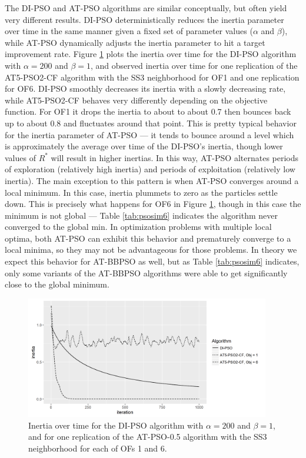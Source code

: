 \documentclass[cmbright]{staauth}
\begin{document}
The DI-PSO and AT-PSO algorithms are similar conceptually, but often yield very different results. DI-PSO deterministically reduces the inertia parameter over time in the same manner given a fixed set of parameter values ($\alpha$ and $\beta$), while AT-PSO dynamically adjusts the inertia parameter to hit a target improvement rate. Figure \ref{fig:inertia} plots the inertia over time for the DI-PSO algorithm with $\alpha=200$ and $\beta=1$, and observed inertia over time for one replication of the AT5-PSO2-CF algorithm with the SS3 neighborhood for OF1 and one replication for OF6. DI-PSO smoothly decreases its inertia with a slowly decreasing rate, while AT5-PSO2-CF behaves very differently depending on the objective function. For OF1 it drops the inertia to about to about 0.7 then bounces back up to about 0.8 and fluctuates around that point. This is pretty typical behavior for the inertia parameter of AT-PSO --- it tends to bounce around a level which is approximately the average over time of the DI-PSO's inertia, though lower values of $R^*$ will result in higher inertias. In this way, AT-PSO alternates periods of exploration (relatively high inertia) and periods of exploitation (relatively low inertia). The main exception to this pattern is when AT-PSO converges around a local minimum. In this case, inertia plummets to zero as the particles settle down. This is precisely what happens for OF6 in Figure \ref{fig:inertia}, though in this case the minimum is not global --- Table \ref{tab:psosim6} indicates the algorithm never converged to the global min. In optimization problems with multiple local optima, both AT-PSO can exhibit this behavior and prematurely converge to a local minima, so they may not be advantageous for those problems. In theory we expect this behavior for AT-BBPSO as well, but as Table \ref{tab:psosim6} indicates, only some variants of the AT-BBPSO algorithms were able to get significantly close to the global minimum.

\begin{figure}[!ht]
\centering
\includegraphics[width=0.95\textwidth]{../code/psosims/inertiaplot.png}
\caption{Inertia over time for the DI-PSO algorithm with $\alpha=200$ and $\beta=1$, and for one replication of the AT-PSO-0.5 algorithm with the SS3 neighborhood for each of OFs 1 and 6.}
\label{fig:inertia}
\end{figure}
\end{document}
